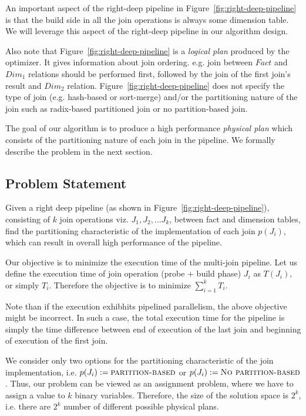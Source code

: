 An important aspect of the right-deep pipeline in Figure~\ref{fig:right-deep-pipeline} is that the build side in all the join operations is always some dimension table. 
We will leverage this aspect of the right-deep pipeline in our algorithm design. 

Also note that Figure~\ref{fig:right-deep-pipeline} is a \textit{logical plan} produced by the optimizer. 
It gives information about join ordering. e.g. join between $Fact$ and $Dim_1$ relations should be performed first, followed by the join of the first join's result and $Dim_2$ relation. 
Figure~\ref{fig:right-deep-pipeline} does not specify the type of join (e.g. hash-based or sort-merge) and/or the partitioning nature of the join such as radix-based partitioned join or no partition-based join. 

The goal of our algorithm is to produce a high performance \textit{physical plan} which consists of the partitioning nature of each join in the pipeline.
We formally describe the problem in the next section.

\subsection{Problem Statement}
Given a right deep pipeline (as shown in Figure~\ref{fig:right-deep-pipeline}), consisting of $k$ join operations viz. $J_1, J_2, \ldots J_k$, between fact and dimension tables, find the partitioning characteristic of the implementation of each join $p(J_i)$, which can result in overall high performance of the pipeline. 

Our objective is to minimize the execution time of the multi-join pipeline. 
Let us define the execution time of join operation (probe + build phase) $J_i$ as $T(J_i)$, or simply $T_i$. 
Therefore the objective is to minimize $\sum\limits_{i=1}^{k}T_i$.

Note than if the execution exhibhits pipelined parallelism, the above objective might be incorrect. 
In such a case, the total execution time for the pipeline is simply the time difference between end of execution of the last join and beginning of execution of the first join. 

We consider only two options for the partitioning characteristic of the join implementation, i.e. $p(J_i) := \textsc{partition-based}$ or $p(J_i) := \textsc{No partition-based}$. 
Thus, our problem can be viewed as an assignment problem, where we have to assign a value to $k$ binary variables.
Therefore, the size of the solution space is $2^k$, i.e. there are $2^k$ number of different possible physical plans. 

